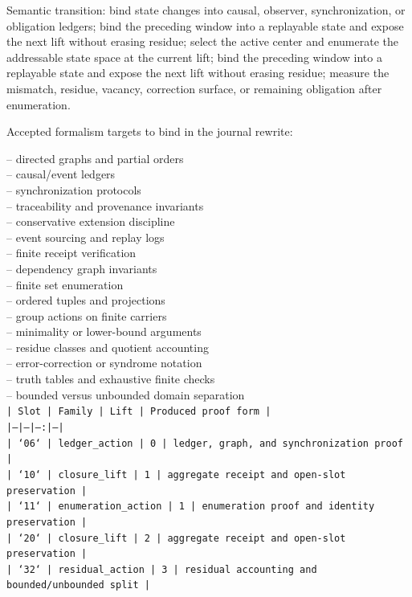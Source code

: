 \documentclass[11pt]{article}
\begin{document}
Semantic transition: bind state changes into causal, observer, synchronization, or obligation ledgers; bind the preceding window into a replayable state and expose the next lift without erasing residue; select the active center and enumerate the addressable state space at the current lift; bind the preceding window into a replayable state and expose the next lift without erasing residue; measure the mismatch, residue, vacancy, correction surface, or remaining obligation after enumeration.

Accepted formalism targets to bind in the journal rewrite:

\noindent{}-- directed graphs and partial orders\\
\noindent{}-- causal/event ledgers\\
\noindent{}-- synchronization protocols\\
\noindent{}-- traceability and provenance invariants\\
\noindent{}-- conservative extension discipline\\
\noindent{}-- event sourcing and replay logs\\
\noindent{}-- finite receipt verification\\
\noindent{}-- dependency graph invariants\\
\noindent{}-- finite set enumeration\\
\noindent{}-- ordered tuples and projections\\
\noindent{}-- group actions on finite carriers\\
\noindent{}-- minimality or lower-bound arguments\\
\noindent{}-- residue classes and quotient accounting\\
\noindent{}-- error-correction or syndrome notation\\
\noindent{}-- truth tables and exhaustive finite checks\\
\noindent{}-- bounded versus unbounded domain separation\\

\noindent\texttt{| Slot | Family | Lift | Produced proof form |}\\
\noindent\texttt{|---|---|---:|---|}\\
\noindent\texttt{| `06` | ledger\_action | 0 | ledger, graph, and synchronization proof |}\\
\noindent\texttt{| `10` | closure\_lift | 1 | aggregate receipt and open-slot preservation |}\\
\noindent\texttt{| `11` | enumeration\_action | 1 | enumeration proof and identity preservation |}\\
\noindent\texttt{| `20` | closure\_lift | 2 | aggregate receipt and open-slot preservation |}\\
\noindent\texttt{| `32` | residual\_action | 3 | residual accounting and bounded/unbounded split |}\\
\end{document}
